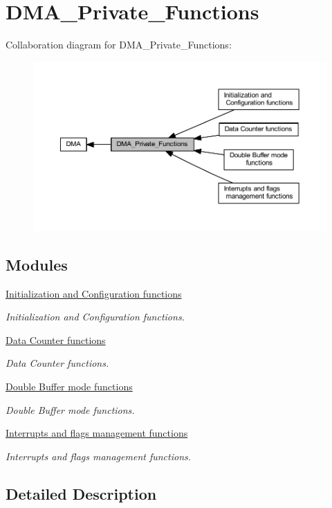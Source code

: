 \hypertarget{group___d_m_a___private___functions}{}\section{D\+M\+A\+\_\+\+Private\+\_\+\+Functions}
\label{group___d_m_a___private___functions}
Collaboration diagram for D\+M\+A\+\_\+\+Private\+\_\+\+Functions\+:
\nopagebreak
\begin{figure}[H]
\begin{center}
\leavevmode
\includegraphics[width=350pt]{group___d_m_a___private___functions}
\end{center}
\end{figure}
\subsection*{Modules}
\begin{DoxyCompactItemize}
\item 
\hyperlink{group___d_m_a___group1}{Initialization and Configuration functions}
\begin{DoxyCompactList}\small\item\em Initialization and Configuration functions. \end{DoxyCompactList}\item 
\hyperlink{group___d_m_a___group2}{Data Counter functions}
\begin{DoxyCompactList}\small\item\em Data Counter functions. \end{DoxyCompactList}\item 
\hyperlink{group___d_m_a___group3}{Double Buffer mode functions}
\begin{DoxyCompactList}\small\item\em Double Buffer mode functions. \end{DoxyCompactList}\item 
\hyperlink{group___d_m_a___group4}{Interrupts and flags management functions}
\begin{DoxyCompactList}\small\item\em Interrupts and flags management functions. \end{DoxyCompactList}\end{DoxyCompactItemize}


\subsection{Detailed Description}
